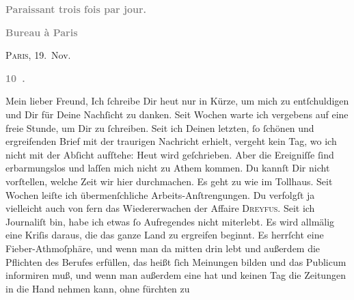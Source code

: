 \begin{ledgroupsized}[t]{13cm}
           \pstart
           \begin{otherlanguage}{french}\textcolor{gray}{\textbf{\textbf{Paraissant trois fois par jour.}}}\end{otherlanguage}\pend
           \pstart
           \begin{otherlanguage}{french}\textcolor{gray}{\textbf{\textbf{Bureau à Paris}}}\end{otherlanguage}\hfill \textsc{Paris}, 19. Nov.\pend
           \pstart
           \begin{otherlanguage}{french}\textcolor{gray}{\textbf{\textbf{10 .}}}\end{otherlanguage}\pend
           \pstart\center{}Mein lieber Freund,\pend\pstart
           Ich ſchreibe Dir heut nur in Kürze, um mich zu
                  entſchuldigen\strikeout{\textcolor{gray}{.}} und Dir für Deine Nachſicht zu danken. Seit Wochen warte ich vergebens auf
               eine freie Stunde, um \strikeout{\textcolor{gray}{×}\-\textcolor{gray}{×}\-\textcolor{gray}{×}} Dir zu  ſchreiben. Seit ich Deinen letzten, ſo ſchönen und ergreifenden Brief mit der
               traurigen Nachricht erhielt, vergeht kein Tag, wo ich nicht mit der Abſicht aufſtehe:
               Heut wird geſchrieben. Aber die Ereigniſſe ſind erbarmungslos und laſſen mich nicht
               zu Athem kommen.  Du kannſt Dir nicht vorſtellen,
               welche Zeit wir {\pb}hier durchmachen. Es geht zu wie im
               Tollhaus. Seit Wochen leiſte ich übermenſchliche Arbeits-Anſtrengungen. Du verfolgſt
               ja vielleicht auch von fern das Wiedererwachen der Affaire \textsc{Dreyfus}. Seit ich Journaliſt bin, habe ich etwas ſo Aufregendes nicht miterlebt. Es
               wird allmälig eine Kriſis daraus, die das ganze Land zu ergreifen beginnt. Es herrſcht eine Fieber-Athmoſphäre,
               und wenn man da mitten drin lebt und außerdem die Pflichten des Berufes erfüllen, das
               heißt ſich Meinungen bilden und das Publicum informiren muß, und wenn man außerdem
               eine \label{K_L02831-1v}\label{K_L02831-1h} hat und keinen Tag die Zeitungen in die Hand nehmen kann, ohne fürchten zu

\end{ledgroupsized}
